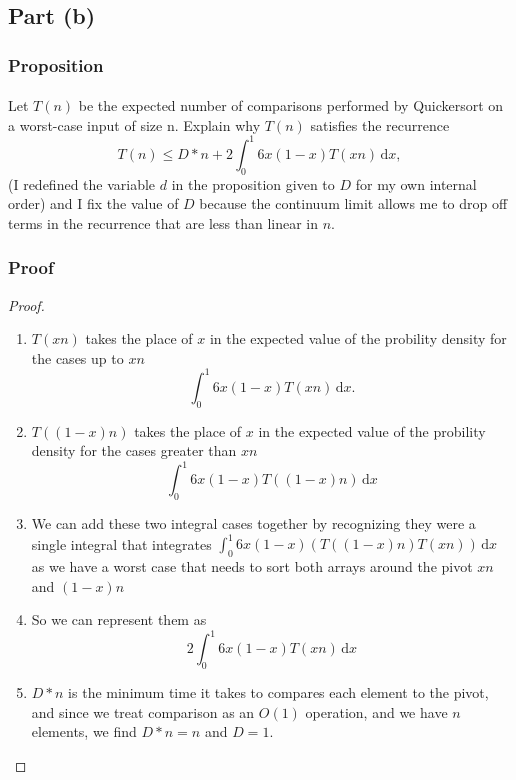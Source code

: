 \documentclass{article}
\begin{document}
\subsection{Part (b)}
\subsubsection{Proposition}
\paragraph{\indent}
Let \(T(n)\) be the expected number of comparisons performed
by Quickersort on a worst-case input of size n. Explain why \(T(n)\) satisfies the recurrence
\[T(n) \leq D*n + 2 \int_0^1  6x(1-x) T(xn) \, \mathrm{d}x, \]
(I redefined the variable \(d\) in the proposition given to \(D\) for my own internal
order) and I fix the value of \(D\) because the continuum limit allows me to drop off
terms in the recurrence that are less than linear in \(n\).
\subsubsection{Proof}
\begin{proof}
      \begin{enumerate}
            \item \(T(xn)\) takes the place of \(x\) in the expected value of the probility density for
                  the cases up to \(xn\)  \[\int_0^1  6x(1-x) T(xn) \, \mathrm{d}x.\]
            \item \(T((1-x)n)\)  takes the place of \(x\) in the expected value of the probility density
                  for the cases greater than \(xn\)  \[\int_0^1  6x(1-x) T((1-x)n) \, \mathrm{d}x\]
            \item We can add these two integral cases together by recognizing they were a single integral
                  that integrates \(\int_0^1  6x(1-x) (T((1-x)n)T(xn)) \, \mathrm{d}x\) as we have a worst
                  case that needs to sort both arrays around the pivot \(xn\) and \((1-x)n\)
            \item So we can represent them as
                  \[2\int_0^1  6x(1-x) T(xn) \, \mathrm{d}x\]
            \item \(D*n\) is the minimum time it takes to compares each element to the pivot, and since
                  we treat comparison as an \(O(1)\) operation, and we have \(n\) elements, we find
                  \(D*n=n\) and \(D=1\).
      \end{enumerate}
\end{proof}
\end{document}
